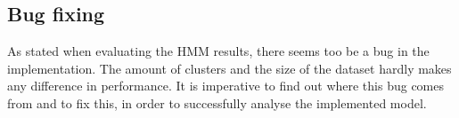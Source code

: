 \subsection{Bug fixing}

As stated when evaluating the HMM results, there seems too be a bug in the implementation. The amount of clusters and the size of the dataset hardly makes any difference in performance. It is imperative to find out where this bug comes from and to fix this, in order to successfully analyse the implemented model.

